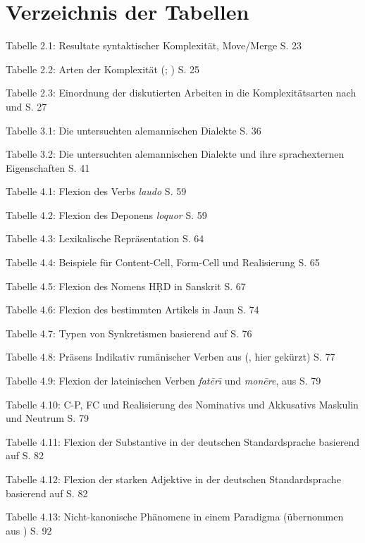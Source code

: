 \chapter{Verzeichnis der Tabellen}\label{appendix3}

Tabelle 2.1: Resultate syntaktischer Komplexität, Move/Merge \citep[16]{Garzonio2016}  S. 23

Tabelle 2.2: Arten der Komplexität (\citealt[9]{Rescher1998}; \citealt[23]{Sinnemäki2011})  S. 25

Tabelle 2.3: Einordnung der diskutierten Arbeiten in die Komplexitätsarten nach \citet{Rescher1998} und \citet{Sinnemäki2011}  S. 27

Tabelle 3.1: Die untersuchten alemannischen Dialekte  S. 36

Tabelle 3.2: Die untersuchten alemannischen Dialekte und ihre sprachexternen Eigenschaften  S. 41

Tabelle 4.1: Flexion des Verbs \textit{laudo} \citep[74]{SadlerSpencer2001}   S. 59

Tabelle 4.2: Flexion des Deponens \textit{loquor} \citep[75]{SadlerSpencer2001}   S. 59

Tabelle 4.3: Lexikalische Repräsentation \citep[124]{AckermanStump2004}   S. 64

Tabelle 4.4: Beispiele für Content-Cell, Form-Cell und Realisierung  S. 65

Tabelle 4.5: Flexion des Nomens HṚD in Sanskrit \citep[121]{AckermanStump2004}   S. 67

Tabelle 4.6: Flexion des bestimmten Artikels in Jaun \citep[282]{Stucki1917}  S. 74

Tabelle 4.7: Typen von Synkretismen basierend auf \citet[212–217]{Stump2001}  S. 76

Tabelle 4.8: Präsens Indikativ rumänischer Verben aus (\citealt[214]{Stump2001}, hier gekürzt)  S. 77

Tabelle 4.9: Flexion der lateinischen Verben \textit{fat\=er\=\i} und \textit{mon\=ere}, aus \citep[122]{AckermanStump2004}   S. 79

Tabelle 4.10: C-P, FC und Realisierung des Nominativs und Akkusativs Maskulin und Neutrum  S. 79

Tabelle 4.11: Flexion der Substantive in der deutschen Standardsprache basierend auf \citet[158–167]{Eisenberg2006}  S. 82

Tabelle 4.12: Flexion der starken Adjektive in der deutschen Standardsprache basierend auf \citet[178]{Eisenberg2006}  S. 82

Tabelle 4.13: Nicht-kanonische Phänomene in einem Paradigma (übernommen aus \citealt[95]{Camilleri2012})  S. 92

